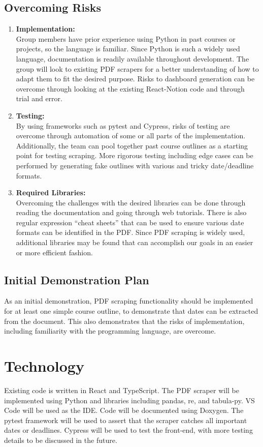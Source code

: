 \documentclass[12pt, titlepage]{article}
\begin{document}
\subsection{Overcoming Risks}
\begin{enumerate}
  \item \textbf{Implementation:}\\
Group members have prior experience using Python in past courses or projects, so the language is familiar. Since Python is such a widely used language, documentation is readily available throughout development. The group will look to existing PDF scrapers for a better understanding of how to adapt them to fit the desired purpose. Risks to dashboard generation can be overcome through looking at the existing React-Notion code and through trial and error. 
  \item \textbf{Testing:}\\
By using frameworks such as pytest and Cypress, risks of testing are overcome through automation of some or all parts of the implementation. Additionally, the team can pool together past course outlines as a starting point for testing scraping. More rigorous testing including edge cases can be performed by generating fake outlines with various and tricky date/deadline formats.  
  \item \textbf{Required Libraries:}\\
Overcoming the challenges with the desired libraries can be done through reading the documentation and going through web tutorials. There is also regular expression “cheat sheets” that can be used to ensure various date formats can be identified in the PDF. Since PDF scraping is widely used, additional libraries may be found that can accomplish our goals in an easier or more efficient fashion. 
\end{enumerate}

\subsection{Initial Demonstration Plan}
As an initial demonstration, PDF scraping functionality should be implemented for at least one simple course outline, to demonstrate that dates can be extracted from the document. This also demonstrates that the risks of implementation, including familiarity with the programming language, are overcome. 

\section{Technology}
Existing code is written in React and TypeScript. The PDF scraper will be implemented using Python and libraries including pandas, re, and tabula-py. VS Code will be used as the IDE. Code will be documented using Doxygen. The pytest framework will be used to assert that the scraper catches all important dates or deadlines. Cypress will be used to test the front-end, with more testing details to be discussed in the future. 
\end{document}
